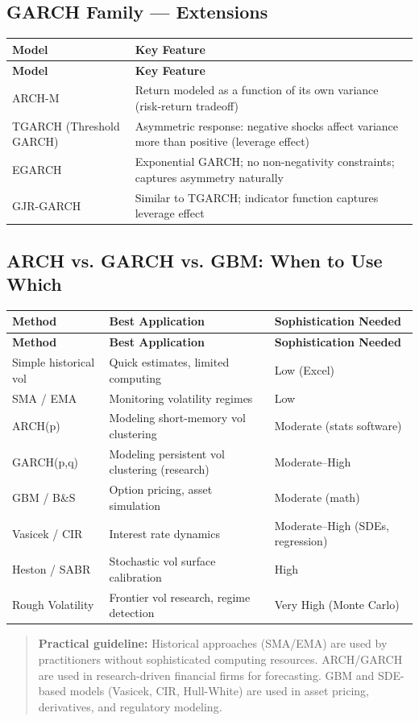 \documentclass[12pt,openany]{book}
\theoremstyle{definition}
\theoremstyle{remark}
\begin{document}
\medskip
\subsection{GARCH Family --- Extensions}
\begingroup
\footnotesize
\begin{longtable}{@{}L{0.27\textwidth}L{0.66\textwidth}@{}}
\toprule
\textbf{Model} & \textbf{Key Feature} \\
\midrule
\endfirsthead
\toprule
\textbf{Model} & \textbf{Key Feature} \\
\midrule
\endhead
ARCH-M & Return modeled as a function of its own variance (risk-return tradeoff) \\
TGARCH (Threshold GARCH) & Asymmetric response: negative shocks affect variance more than positive (leverage effect) \\
EGARCH & Exponential GARCH; no non-negativity constraints; captures asymmetry naturally \\
GJR-GARCH & Similar to TGARCH; indicator function captures leverage effect \\
\bottomrule
\end{longtable}
\endgroup
\medskip
\subsection{ARCH vs. GARCH vs. GBM: When to Use Which}
\begingroup
\footnotesize
\begin{longtable}{@{}L{0.19\textwidth}L{0.36\textwidth}L{0.36\textwidth}@{}}
\toprule
\textbf{Method} & \textbf{Best Application} & \textbf{Sophistication Needed} \\
\midrule
\endfirsthead
\toprule
\textbf{Method} & \textbf{Best Application} & \textbf{Sophistication Needed} \\
\midrule
\endhead
Simple historical vol & Quick estimates, limited computing & Low (Excel) \\
SMA / EMA & Monitoring volatility regimes & Low \\
ARCH(p) & Modeling short-memory vol clustering & Moderate (stats software) \\
GARCH(p,q) & Modeling persistent vol clustering (research) & Moderate--High \\
GBM / B\&S & Option pricing, asset simulation & Moderate (math) \\
Vasicek / CIR & Interest rate dynamics & Moderate--High (SDEs, regression) \\
Heston / SABR & Stochastic vol surface calibration & High \\
Rough Volatility & Frontier vol research, regime detection & Very High (Monte Carlo) \\
\bottomrule
\end{longtable}
\endgroup
\begin{quote}
\textbf{Practical guideline:} Historical approaches (SMA/EMA) are used by practitioners without sophisticated computing resources. ARCH/GARCH are used in research-driven financial firms for forecasting. GBM and SDE-based models (Vasicek, CIR, Hull-White) are used in asset pricing, derivatives, and regulatory modeling.

\end{quote}
\medskip
\end{document}
